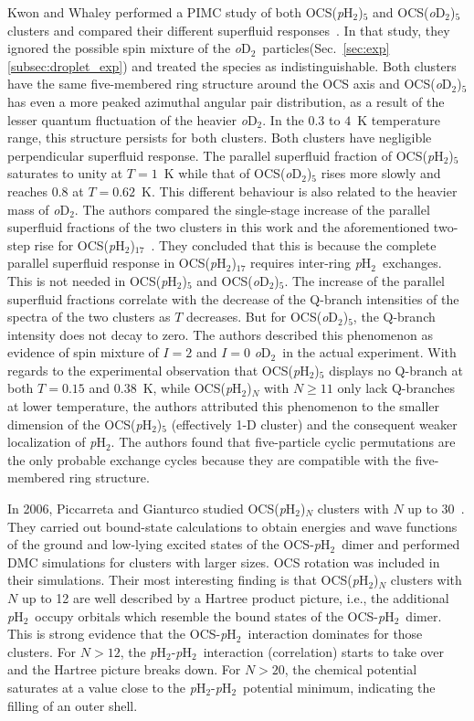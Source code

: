 \documentclass[12pt]{iopart}
\newcommand{\odtwo}{{\em o}D$_2$}
\newcommand{\phtwo}{{\em p}H$_2$}
\begin{document}
Kwon and Whaley performed a PIMC study of both OCS(\phtwo)$_5$ and OCS(\odtwo)$_5$ clusters and compared their different superfluid responses~\cite{kwon_ocs_five_h2}. 
In that study, they ignored the possible spin mixture of the \odtwo~particles(Sec.~\ref{sec:exp}\ref{subsec:droplet_exp}) and treated the species as indistinguishable. 
Both clusters have the same five-membered ring structure around the OCS axis and OCS(\odtwo)$_5$ has even a more peaked azimuthal angular pair distribution, as a result of the lesser quantum fluctuation of the heavier \odtwo. 
In the  $0.3$ to $4$~K temperature range, this structure persists for both clusters. 
Both clusters have negligible perpendicular superfluid response.  
The parallel superfluid fraction of OCS(\phtwo)$_5$ saturates to unity at $T=1$~K while that of OCS(\odtwo)$_5$ rises more slowly and reaches 0.8 at $T=0.62$~K. 
This different behaviour is also related to the heavier mass of \odtwo. 
The authors compared the single-stage increase of the parallel superfluid fractions of the two clusters in this work and the aforementioned two-step rise for OCS(\phtwo)$_{17}$~\cite{kwon_OCS_pH2}. 
They concluded that this is because the complete parallel superfluid response in OCS(\phtwo)$_{17}$ requires inter-ring \phtwo~exchanges.
This is not needed in OCS(\phtwo)$_5$ and OCS(\odtwo)$_5$. 
The increase of the parallel superfluid fractions correlate with the decrease of the Q-branch intensities of the spectra of the two clusters as $T$ decreases. 
But for OCS(\odtwo)$_5$, the Q-branch intensity does not decay to zero. 
The authors described this phenomenon as evidence of spin mixture of $I=2$ and $I=0$ \odtwo~in the actual experiment. 
With regards to the experimental observation that OCS(\phtwo)$_5$ displays no Q-branch at both $T=0.15$ and $0.38$~K, while OCS(\phtwo)$_N$ with $N\ge 11$ only lack Q-branches at  lower temperature, the authors attributed this phenomenon to the smaller dimension of the OCS(\phtwo)$_5$ (effectively 1-D cluster) and the consequent weaker localization of \phtwo. 
The authors found that five-particle cyclic permutations are the only probable exchange cycles because they are compatible with the five-membered ring structure.

In 2006, Piccarreta and Gianturco studied OCS(\phtwo)$_N$ clusters with $N$ up to 30~\cite{piccarreta_ocs_h2}. 
They carried out bound-state calculations to obtain energies and wave functions of the ground and low-lying excited states of the OCS-\phtwo~dimer and performed DMC simulations for clusters with larger sizes. 
OCS rotation was included in their simulations. 
Their most interesting finding is that OCS(\phtwo)$_N$ clusters with $N$ up to 12 are well described by a Hartree product picture, i.e., the additional \phtwo~occupy orbitals which resemble the bound states of the OCS-\phtwo~dimer. 
This is strong evidence that the OCS-\phtwo~interaction dominates for those clusters. 
For $N > 12$, the \phtwo-\phtwo~interaction (correlation) starts to take over and the Hartree picture breaks down. 
For $N > 20$, the chemical potential saturates at a value close to the \phtwo-\phtwo~potential minimum, 
indicating the filling of an outer shell.
\end{document}
